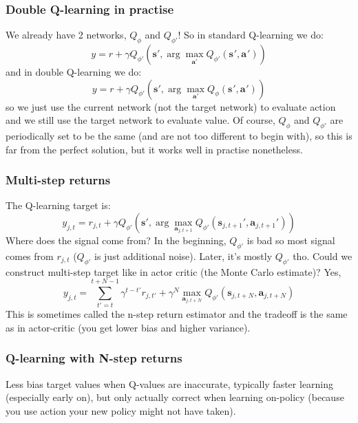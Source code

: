 \documentclass{report}
\newcommand{\argmax}{\arg\!\max}
\begin{document}
\subsubsection{Double Q-learning in practise}
We already have 2 networks, $Q_\phi$ and $Q_{\phi'}$!
So in standard Q-learning we do:
\begin{equation}
		y = r + \gamma Q_{\phi'}\left( \bm{s}', \argmax_{\bm{a}'}Q_{\phi'}(\bm{s}_{}', \bm{a}_{}') \right)
\end{equation}
and in double Q-learning we do:
\begin{equation}
		y = r + \gamma Q_{\phi'}\left( \bm{s}', \argmax_{\bm{a}'}Q_{\phi}(\bm{s}_{}', \bm{a}_{}') \right)
\end{equation}
so we just use the current network (not the target network) to evaluate action
and we still use the target network to evaluate value.
Of course, $Q_\phi$ and $Q_{\phi'}$ are periodically set to be the same (and are not too different to begin with), 
so this is far from the perfect solution, 
but it works well in practise nonetheless.

\subsubsection{Multi-step returns}
The Q-learning target is:
\begin{equation}
y_{j,t} = r_{j,t} + \gamma Q_{\phi'}\left( \bm{s}', \argmax_{\bm{a}_{j,t+1}}Q_{\phi'}(\bm{s}_{j,t+1}', \bm{a}_{j,t+1}') \right)
\end{equation}
Where does the signal come from?
In the beginning, $Q_{\phi'}$ is bad so most signal comes from $r_{j,t}$ ($Q_{\phi'}$ is just additional noise).
Later, it's mostly $Q_{\phi'}$ tho.
Could we construct multi-step target like in actor critic (the Monte Carlo estimate)?
Yes,
\begin{equation}
		y_{j,t} = \sum_{t'=t}^{t+N-1} \gamma^{t-t'}    r_{j,t'} + \gamma^N  \max_{\bm{a}_{j,t+N}}Q_{\phi'}(\bm{s}_{j,t+N}, \bm{a}_{j,t+N}) 
\end{equation}
This is sometimes called the n-step return estimator and the tradeoff is the same as in actor-critic (you get lower bias
and higher variance).

\subsubsection{Q-learning with N-step returns}
Less bias target values when Q-values are inaccurate,
typically faster learning (especially early on), but only actually correct when learning on-policy (because you use action
your new policy might not have taken).
\end{document}
